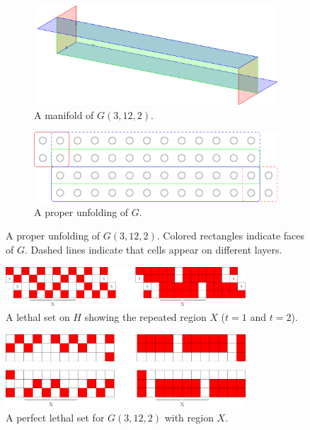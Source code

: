 
\begin{figure}[]
\centering
\begin{subfigure}{0.45\textwidth}
	\includegraphics[width=\textwidth]{figures/7/3x12x2_manifold_3d.pdf}
	\caption{A manifold of $G(3,12,2)$.}
	\label{fig:3x12x2_manifold_a}
\end{subfigure} \hfill%
\begin{subfigure}{0.45\textwidth}
	\includegraphics[width=\textwidth]{figures/7/3x12x2_manifold.pdf}
	\caption{A proper unfolding of $G$.}
	\label{fig:3x12x2_manifold_b}
\end{subfigure}
\caption{A proper unfolding of $G(3,12,2)$. Colored rectangles indicate faces of $G$. Dashed lines indicate that cells appear on different layers. }
\label{fig:3x12x2_manifold}
\end{figure} 

\begin{figure}[]
\centering
\includegraphics[width=0.8\textwidth]{figures/7/3x12x2_unfolded_lethal.pdf}
\caption{A lethal set on $H$ showing the repeated region $X$ ($t=1$ and $t=2$).}
\label{fig:3x12x2_unfolded_lethal}
\end{figure} 

\begin{figure}[]
\centering
\includegraphics[width=0.8\textwidth]{figures/7/3x12x2.pdf}
\caption{A perfect lethal set for $G(3,12,2)$ with region $X$.}
\label{fig:3x12x2}
\end{figure} 

